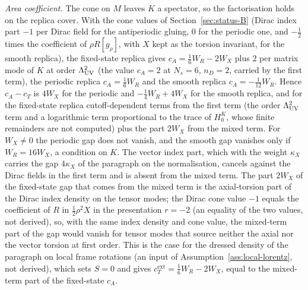 \emph{Area coefficient.} The cone on \(M\) leaves \(K\) a spectator, so the factorisation holds on the replica cover. With the cone values of Section~\ref{sec:status-B} (Dirac index part \(-1\) per Dirac field for the antiperiodic gluing, \(0\) for the periodic one, and \(-\tfrac12\) times the coefficient of \(\rho R[g_\rho]\), with \(X\) kept as the torsion invariant, for the smooth replica), the fixed-state replica gives \(c_A=\tfrac16W_R-2W_X\) plus \(2\) per matrix mode of \(K\) at order \(\Lambda_{\mathrm{UV}}^2\) (the value \(c_A=2\) at \(N_s=6\), \(n_D=2\), carried by the first term), the periodic replica \(c_A=\tfrac16W_R\) and the smooth replica \(c_A=-\tfrac1{12}W_R\). Hence \(c_A-c_T\) is \(4W_X\) for the periodic and \(-\tfrac14W_R+4W_X\) for the smooth replica, and for the fixed-state replica cutoff-dependent terms from the first term (the order \(\Lambda_{\mathrm{UV}}^2\) term and a logarithmic term proportional to the trace of \(H_0^K\), whose finite remainders are not computed) plus the part \(2W_X\) from the mixed term. For \(W_X\neq0\) the periodic gap does not vanish, and the smooth gap vanishes only if \(W_R=16W_X\), a condition on \(K\). The vector index part, which with the weight \(\kappa_X\) carries the gap \(4\kappa_X\) of the paragraph on the normalisation, cancels against the Dirac fields in the first term and is absent from the mixed term. The part \(2W_X\) of the fixed-state gap that comes from the mixed term is the axial-torsion part of the Dirac index density on the tensor modes; the Dirac cone value \(-1\) equals the coefficient of \(R\) in \(\tfrac12\rho^2X\) in the presentation \(r=-2\) (an equality of the two values, not derived), so, with the same index density and cone value, the mixed-term part of the gap would vanish for tensor modes that source neither the axial nor the vector torsion at first order. This is the case for the dressed density of the paragraph on local frame rotations (an input of Assumption~\ref{ass:local-lorentz}, not derived), which sets \(S=0\) and gives \(c_T^{\mathrm{ext}}=\tfrac16W_R-2W_X\), equal to the mixed-term part of the fixed-state \(c_A\).

